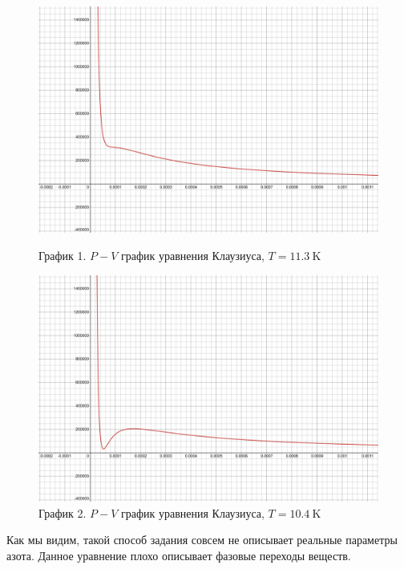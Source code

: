 \documentclass[a4paper]{article}
\numberwithin{equation}{subsection} %
\begin{document}
\begin{figure}[h!]
    \centering
    \begin{minipage}{0.49\textwidth}
        \centering
        \includegraphics[width=\linewidth]{Graphics/Clausius/11_3.png}
        \caption{\label{fig:clausius_1}График 1. $P-V$ график уравнения Клаузиуса, $T = 11.3 \ \text{K}$}
    \end{minipage}
    \hfill
    \begin{minipage}{0.49\textwidth}
        \centering
        \includegraphics[width=\linewidth]{Graphics/Clausius/10_4.png}
        \caption{\label{fig:clausius_2}График 2. $P-V$ график уравнения Клаузиуса, $T = 10.4 \ \text{K}$}
    \end{minipage}
\end{figure}
Как мы видим, такой способ задания совсем не описывает реальные параметры азота. Данное уравнение плохо описывает фазовые переходы веществ.
\end{document}
